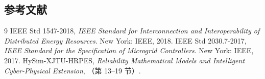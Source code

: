 \subsection{参考文献}
\begin{thebibliography}{9}\small
{} IEEE Std 1547-2018, \emph{IEEE Standard for Interconnection and
  Interoperability of Distributed Energy Resources}. New York: IEEE, 2018.
 IEEE Std 2030.7-2017, \emph{IEEE Standard for the Specification of
  Microgrid Controllers}. New York: IEEE, 2017.
 HySim-XJTU-HRPES, \emph{Reliability Mathematical Models and Intelligent
  Cyber-Physical Extension}, （第 13--19 节）.
\end{thebibliography}

